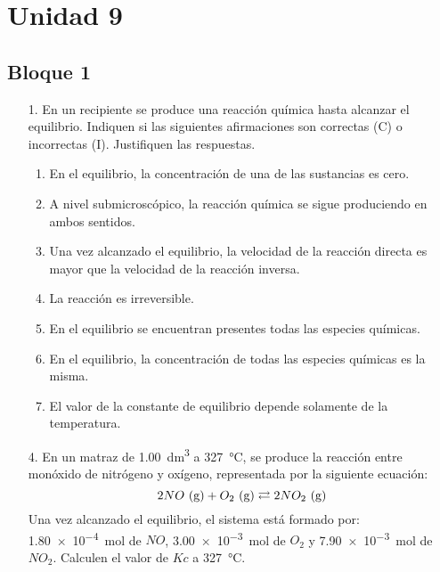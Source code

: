 \documentclass[../Práctica.root.tex]{subfiles}
\begin{document}
\section{Unidad 9}
\subsection{Bloque 1}
\begin{enumerate}
    \item[1.] En un recipiente se produce una reacción química hasta alcanzar el equilibrio. Indiquen si
          las siguientes afirmaciones son correctas (C) o incorrectas (I). Justifiquen las respuestas.
          \begin{enumerate}
              \item En el equilibrio, la concentración de una de las sustancias es cero.
              \item A nivel submicroscópico, la reacción química se sigue produciendo en ambos
                    sentidos.
              \item Una vez alcanzado el equilibrio, la velocidad de la reacción directa es mayor que la
                    velocidad de la reacción inversa.
              \item La reacción es irreversible.
              \item En el equilibrio se encuentran presentes todas las especies químicas.
              \item En el equilibrio, la concentración de todas las especies químicas es la misma.
              \item El valor de la constante de equilibrio depende solamente de la temperatura.
          \end{enumerate}

    \item[4.] En un matraz de \SI{1,00}{\dm\cubed} a \SI{327}{\celsius}, se produce la reacción entre monóxido de nitrógeno y
          oxígeno, representada por la siguiente ecuación:
          \[ 2 NO \ \text{(g)} + O_2 \ \text{(g)} \rightleftarrows{} 2 NO_2 \ \text{(g)} \]
          Una vez alcanzado el equilibrio, el sistema está formado por: \SI{1,80e-4}{\mole} de $NO$,
          \SI{3,00e-3}{\mole} de $O_2$ y \SI{7,90e-3}{\mole} de $NO_2$. Calculen el valor de $Kc$ a \SI{327}{\celsius}.


\end{enumerate}
\end{document}
